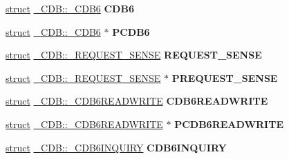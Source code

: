 \begin{DoxyCompactItemize}
\item 
\mbox{\label{union___c_d_b_a6b5242133d2203d79f1ced0b2f01b0e2}} 
\hyperlink{interfacestruct}{struct} \hyperlink{struct___c_d_b_1_1___c_d_b6}{\+\_\+\+C\+D\+B\+::\+\_\+\+C\+D\+B6} {\bfseries C\+D\+B6}
\item 
\mbox{\label{union___c_d_b_a5c43d12497e7c98bacd2dc0d93d52b06}} 
\hyperlink{interfacestruct}{struct} \hyperlink{struct___c_d_b_1_1___c_d_b6}{\+\_\+\+C\+D\+B\+::\+\_\+\+C\+D\+B6} $\ast$ {\bfseries P\+C\+D\+B6}
\item 
\mbox{\label{union___c_d_b_a17df076efc9716a9913eb4411d53cd5c}} 
\hyperlink{interfacestruct}{struct} \hyperlink{struct___c_d_b_1_1___r_e_q_u_e_s_t___s_e_n_s_e}{\+\_\+\+C\+D\+B\+::\+\_\+\+R\+E\+Q\+U\+E\+S\+T\+\_\+\+S\+E\+N\+SE} {\bfseries R\+E\+Q\+U\+E\+S\+T\+\_\+\+S\+E\+N\+SE}
\item 
\mbox{\label{union___c_d_b_ad47309886b223eb0a54de2a6739e4aa1}} 
\hyperlink{interfacestruct}{struct} \hyperlink{struct___c_d_b_1_1___r_e_q_u_e_s_t___s_e_n_s_e}{\+\_\+\+C\+D\+B\+::\+\_\+\+R\+E\+Q\+U\+E\+S\+T\+\_\+\+S\+E\+N\+SE} $\ast$ {\bfseries P\+R\+E\+Q\+U\+E\+S\+T\+\_\+\+S\+E\+N\+SE}
\item 
\mbox{\label{union___c_d_b_af85ce2c861844798b07ad99a6584732b}} 
\hyperlink{interfacestruct}{struct} \hyperlink{struct___c_d_b_1_1___c_d_b6_r_e_a_d_w_r_i_t_e}{\+\_\+\+C\+D\+B\+::\+\_\+\+C\+D\+B6\+R\+E\+A\+D\+W\+R\+I\+TE} {\bfseries C\+D\+B6\+R\+E\+A\+D\+W\+R\+I\+TE}
\item 
\mbox{\label{union___c_d_b_a7b416886e5b86ccddafa34b1c03f4f4f}} 
\hyperlink{interfacestruct}{struct} \hyperlink{struct___c_d_b_1_1___c_d_b6_r_e_a_d_w_r_i_t_e}{\+\_\+\+C\+D\+B\+::\+\_\+\+C\+D\+B6\+R\+E\+A\+D\+W\+R\+I\+TE} $\ast$ {\bfseries P\+C\+D\+B6\+R\+E\+A\+D\+W\+R\+I\+TE}
\item 
\mbox{\label{union___c_d_b_a7fb678dc2b854c4aabc87b1696c87f2c}} 
\hyperlink{interfacestruct}{struct} \hyperlink{struct___c_d_b_1_1___c_d_b6_i_n_q_u_i_r_y}{\+\_\+\+C\+D\+B\+::\+\_\+\+C\+D\+B6\+I\+N\+Q\+U\+I\+RY} {\bfseries C\+D\+B6\+I\+N\+Q\+U\+I\+RY}
\item 

\end{DoxyCompactItemize}

